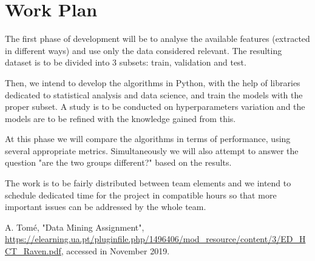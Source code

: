 \documentclass[conference]{IEEEtran}
\begin{document}
\section{Work Plan}

The first phase of development will be to analyse the available features 
(extracted in different ways) and use only the data considered relevant.
The resulting dataset is to be divided into 3 subsets: train, validation and test.

Then, we intend to develop the algorithms in Python, with the help of libraries
dedicated to statistical analysis and data science, and train the models with the
proper subset.
A study is to be conducted on hyperparameters variation and the models are to be
refined with the knowledge gained from this.

At this phase we will compare the algorithms in terms of performance, using 
several appropriate metrics.
Simultaneously we will also attempt to answer the question "are the two groups
different?" based on the results.

The work is to be fairly distributed between team elements and we intend 
to schedule dedicated time for the project in compatible hours so that more 
important issues can be addressed by the whole team.








\begin{thebibliography}{00}
 A. Tomé, "Data Mining Assignment", \url{https://elearning.ua.pt/pluginfile.php/1496406/mod_resource/content/3/ED_HCT_Raven.pdf}, accessed in November 2019.
\end{thebibliography}
\vspace{12pt}
\end{document}
